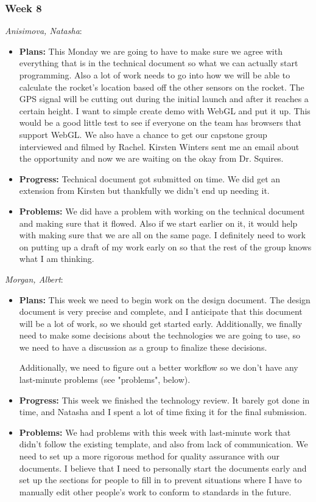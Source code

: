 \documentclass[10pt,draftclsnofoot,onecolumn]{IEEEtran}
\newcommand{\subsubsubsection}[1]{
	\hfill\break\textit{#1}:
}
\begin{document}
\subsubsection{Week 8}
\subsubsubsection{Anisimova, Natasha}
\begin{itemize}
	\item \textbf{Plans: }
	This Monday we are going to have to make sure we agree with everything that is in the technical document so what we can actually start programming. Also a lot of work needs to go into how we will be able to calculate the rocket's location based off the other sensors on the rocket. The GPS signal will be cutting out during the initial launch and after it reaches a certain height. I want to simple create demo with WebGL and put it up. This would be a good little test to see if everyone on the team has browsers that support WebGL. We also have a chance to get our capstone group interviewed and filmed by Rachel. Kirsten Winters sent me an email about the opportunity and now we are waiting on the okay from Dr. Squires.
	\item \textbf{Progress: }
	Technical document got submitted on time. We did get an extension from Kirsten but thankfully we didn't end up needing it.
	\item \textbf{Problems: }
	We did have a problem with working on the technical document and making sure that it flowed. Also if we start earlier on it, it would help with making sure that we are all on the same page. I definitely need to work on putting up a draft of my work early on so that the rest of the group knows what I am thinking.
\end{itemize}
\subsubsubsection{Morgan, Albert}
\begin{itemize}
	\item \textbf{Plans: }
	This week we need to begin work on the design document. The design document is very precise and complete, and I anticipate that this document will be a lot of work, so we should get started early. Additionally, we finally need to make some decisions about the technologies we are going to use, so we need to have a discussion as a group to finalize these decisions.

	Additionally, we need to figure out a better workflow so we don't have any last-minute problems (see "problems", below).
	\item \textbf{Progress: }
	This week we finished the technology review. It barely got done in time, and Natasha and I spent a lot of time fixing it for the final submission.
	\item \textbf{Problems: }
	We had problems with this week with last-minute work that didn't follow the existing template, and also from lack of communication. We need to set up a more rigorous method for quality assurance with our documents. I believe that I need to personally start the documents early and set up the sections for people to fill in to prevent situations where I have to manually edit other people's work to conform to standards in the future.
\end{itemize}
\end{document}
